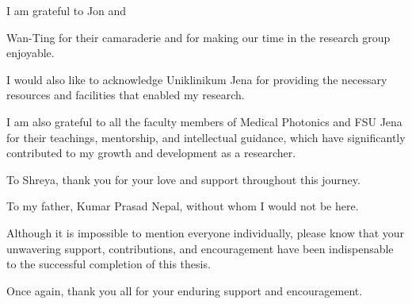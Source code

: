 \documentclass{micro-econ-thesis}
\begin{document}
I am grateful to Jon and

 Wan-Ting for their camaraderie and for making our time in the research group enjoyable.

I would also like to acknowledge Uniklinikum Jena for providing the necessary resources and facilities that enabled my research.


I am also grateful to all the faculty members of Medical Photonics and FSU Jena for their teachings, mentorship, and intellectual guidance, which have significantly contributed to my growth and development as a researcher.
 

To Shreya, thank you for your love and support throughout this journey.

To my father, Kumar Prasad Nepal, without whom I would not be here.

Although it is impossible to mention everyone individually, please know that your unwavering support, contributions, and encouragement have been indispensable to the successful completion of this thesis.

Once again, thank you all for your enduring support and encouragement.

\cleardoublepage
\tableofcontents

\cleardoublepage
{}
{}
\listoffigures
\cleardoublepage
{}
{}
\listoftables

\cleardoublepage
{}
{}
\end{document}
